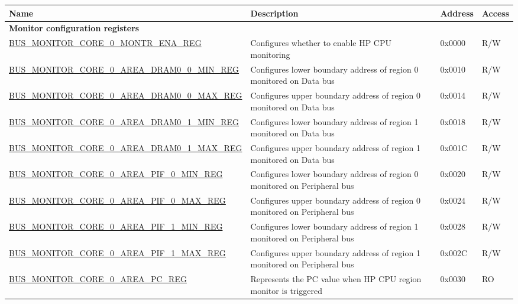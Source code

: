 \begin{longtable}{ |p{9.5cm} | p{11.6cm}| l | l | }
\hline\rowcolor{lightgray}
{\bfseries Name} & {\bfseries Description} &  {\bfseries Address} & {\bfseries Access} \\ \hline
\endhead
\multicolumn{4}{|l|}{\textbf{Monitor configuration registers}} \\ \hline
\hyperref[regdesc:BUSMONITORCORE0MONTRENAREG]{BUS\_MONITOR\_CORE\_0\_MONTR\_ENA\_REG} & Configures whether to enable HP CPU monitoring & 0x0000 & R/W \\ \hline
\hyperref[regdesc:BUSMONITORCORE0AREADRAM00MINREG]{BUS\_MONITOR\_CORE\_0\_AREA\_DRAM0\_0\_MIN\_REG} & Configures lower boundary address of region 0 monitored on Data bus & 0x0010 & R/W \\ \hline
\hyperref[regdesc:BUSMONITORCORE0AREADRAM00MAXREG]{BUS\_MONITOR\_CORE\_0\_AREA\_DRAM0\_0\_MAX\_REG} & Configures upper boundary address of region 0 monitored on Data bus & 0x0014 & R/W \\ \hline
\hyperref[regdesc:BUSMONITORCORE0AREADRAM01MINREG]{BUS\_MONITOR\_CORE\_0\_AREA\_DRAM0\_1\_MIN\_REG} & Configures lower boundary address of region 1 monitored on Data bus & 0x0018 & R/W \\ \hline
\hyperref[regdesc:BUSMONITORCORE0AREADRAM01MAXREG]{BUS\_MONITOR\_CORE\_0\_AREA\_DRAM0\_1\_MAX\_REG} & Configures upper boundary address of region 1 monitored on Data bus & 0x001C & R/W \\ \hline
\hyperref[regdesc:BUSMONITORCORE0AREAPIF0MINREG]{BUS\_MONITOR\_CORE\_0\_AREA\_PIF\_0\_MIN\_REG} & Configures lower boundary address of region 0 monitored on Peripheral bus & 0x0020 & R/W \\ \hline
\hyperref[regdesc:BUSMONITORCORE0AREAPIF0MAXREG]{BUS\_MONITOR\_CORE\_0\_AREA\_PIF\_0\_MAX\_REG} & Configures upper boundary address of region 0 monitored on Peripheral bus & 0x0024 & R/W \\ \hline
\hyperref[regdesc:BUSMONITORCORE0AREAPIF1MINREG]{BUS\_MONITOR\_CORE\_0\_AREA\_PIF\_1\_MIN\_REG} & Configures lower boundary address of region 1 monitored on Peripheral bus & 0x0028 & R/W \\ \hline
\hyperref[regdesc:BUSMONITORCORE0AREAPIF1MAXREG]{BUS\_MONITOR\_CORE\_0\_AREA\_PIF\_1\_MAX\_REG} & Configures upper boundary address of region 1 monitored on Peripheral bus & 0x002C & R/W \\ \hline
\hyperref[regdesc:BUSMONITORCORE0AREAPCREG]{BUS\_MONITOR\_CORE\_0\_AREA\_PC\_REG} & Represents the PC value when HP CPU region monitor is triggered & 0x0030 & RO \\ \hline

\end{longtable}
